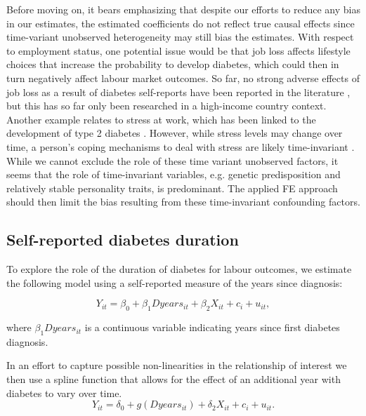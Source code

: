 Before moving on, it bears emphasizing that despite our efforts to reduce any bias in our estimates, the estimated coefficients do not reflect true causal effects since time-variant unobserved heterogeneity may still bias the estimates. With respect to employment status, one potential issue would be that job loss affects lifestyle choices that increase the probability to develop diabetes, which could then in turn negatively affect labour market outcomes. So far, no strong adverse effects of job loss as a result of diabetes self-reports have been reported in the literature \parencite{Bergemann2011,Schaller2015}, but this has so far only been researched in a high-income country context. Another example relates to stress at work, which has been linked to the development of type 2 diabetes \parencite{Heraclides2012,Eriksson2013}. However, while stress levels may change over time, a person's coping mechanisms to deal with stress are likely time-invariant \parencite{Schneiderman2005}. While we cannot exclude the role of these time variant unobserved factors, it seems that the role of time-invariant variables, e.g. genetic predisposition and relatively stable personality traits, is predominant. The applied \ac{FE} approach should then limit the bias resulting from these time-invariant confounding factors. 


\subsection{Self-reported diabetes duration}
To explore the role of the duration of diabetes for labour outcomes, we estimate the following model using a self-reported
measure of the years since diagnosis:


\begin{equation}
Y_{it}=\beta_{0}+\beta_{1}Dyears_{it}+\beta_{2}X_{it}+c_{i}+u_{it},\label{eq:duration_linear}
\end{equation}


\noindent where $\beta_{1}Dyears_{it}$ is a continuous variable indicating years since first diabetes diagnosis.

In an effort to capture possible non-linearities in the relationship of interest we then use a spline function that allows for the effect of an additional year with diabetes to vary over time.
\begin{equation}
Y_{it}=\delta_{0}+g(Dyears_{it})+\delta_{2}X_{it}+c_{i}+u_{it}.\label{eq:splines}
\end{equation}


